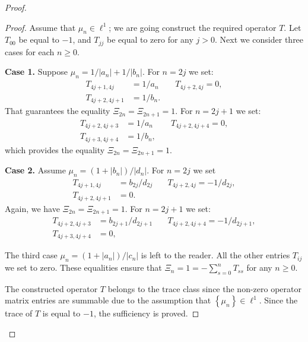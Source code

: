 \begin{proof}
\begin{proof}
        Assume that $\mu_n \in \ell^1$; we are going construct the required operator $T$.
        Let $T_{00}$ be equal to $-1$, and $T_{jj}$ be equal to zero for any $j > 0$.
        Next we consider three cases for each $n \geq 0$.

        \noindent\textbf{Case 1.}
        Suppose $\mu_n = 1/|a_n| + 1/|b_n|$.
        For $n=2j$ we set:
        \begin{align*}
          T_{4j+1,4j}&=1/a_n & \quad T_{4j+2,4j} = 0,\\
          T_{4j+2,4j+1}&=1/b_n.
        \end{align*}
        That guarantees the equality $\Xi_{2n} = \Xi_{2n+1} = 1$.
        For $n=2j+1$ we set:
        \begin{align*}
          T_{4j+2,4j+3}&=1/a_n & \quad T_{4j+2,4j+4} = 0,\\
          T_{4j+3,4j+4}&=1/b_n,
        \end{align*}
        which provides the equality $\Xi_{2n} = \Xi_{2n+1} = 1$.

        \noindent\textbf{Case 2.}
        Assume $\mu_n = (1 + |b_n|)/|d_n|$.
        For $n=2j$ we set
        \begin{align*}
          T_{4j+1,4j} &= b_{2j}/d_{2j} & \quad T_{4j+2,4j} = -1/d_{2j},\\
          T_{4j+2,4j+1} &= 0.
        \end{align*}
        Again, we have $\Xi_{2n} = \Xi_{2n+1} = 1$.
        For $n = 2j + 1$ we set:
        \begin{align*}
          T_{4j+2,4j+3}&=b_{2j+1}/d_{2j+1} & \quad T_{4j+2,4j+4} = -1/d_{2j+1},\\
          T_{4j+3,4j+4}&=0,
        \end{align*}

        The third case $\mu_n = (1 + |a_n|)/|c_n|$ is left to the reader.
        \medskip
        All the other entries $T_{ij}$ we set to zero.
        These equalities ensure that $\Xi_n = 1 = -\sum_{s=0}^n T_{ss}$ for any $n \geq 0$.

        The constructed operator $T$ belongs to the trace class since the non-zero operator matrix entries are summable
          due to the assumption that $\left\{\mu_n\right\} \in \ell^1$.
        Since the trace of $T$ is equal to $-1$, the sufficiency is proved.


\end{proof}
\end{proof}
